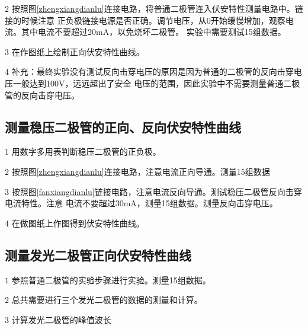 \documentclass{ctexart}
\begin{document}
  \(2\) 按照图\ref{zhengxiangdianlu}连接电路，将普通二极管连入伏安特性测量电路中。链接的时候注意
        正负极链接电源是否正确。调节电压，从0开始缓慢增加，观察电流。其中电流不要超过20mA，以免烧坏二极管。
        实验中需要测试15组数据。

  \(3\) 在作图纸上绘制正向伏安特性曲线。

  \(4\) 补充：最终实验没有测试反向击穿电压的原因是因为普通的二极管的反向击穿电压一般达到100V，远远超出了安全
        电压的范围，因此实验中不需要测量普通二极管的反向击穿电压。

  \subsection{测量稳压二极管的正向、反向伏安特性曲线}
  \(1\) 用数字多用表判断稳压二极管的正负极。
  
  \(2\) 按照图\ref{zhengxiangdianlu}连接电路，注意电流正向导通。测量15组数据

  \(3\) 按照图\ref{fanxiangdianlu}链接电路，注意电流反向导通。测试稳压二极管反向击穿电流特性。注意
        电流不要超过30mA，测量15组数据。测量反向击穿电压。

  \(4\) 在做图纸上作图得到伏安特性曲线。

  \subsection{测量发光二极管正向伏安特性曲线}
  \(1\) 参照普通二极管的实验步骤进行实验。测量15组数据。

  \(2\) 总共需要进行三个发光二极管的数据的测量和计算。

  \(3\) 计算发光二极管的峰值波长
\newpage
\end{document}

